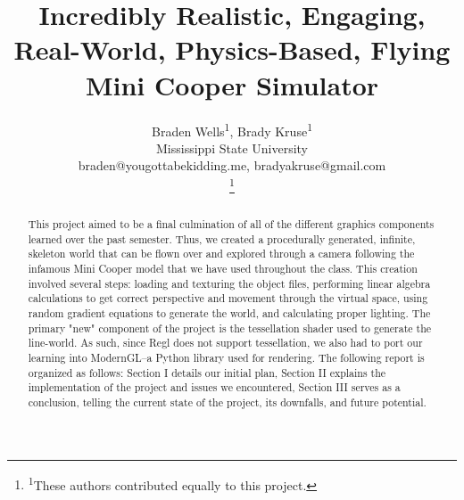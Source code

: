 \documentclass[conference]{IEEEtran}
\begin{document}
\title{Incredibly Realistic, Engaging, Real-World, Physics-Based, Flying Mini Cooper Simulator\\
}

\author{
Braden Wells\textsuperscript{1},
Brady Kruse\textsuperscript{1}
\\
Mississippi State University
\\
\small{braden@yougottabekidding.me, bradyakruse@gmail.com}

\thanks{\textsuperscript{1}These authors contributed equally to this project.}
}

\maketitle

\begin{abstract}
This project aimed to be a final culmination of all of the different graphics components learned over the past semester. Thus, we created a procedurally generated, infinite, skeleton world that can be flown over and explored through a camera following the infamous Mini Cooper model that we have used throughout the class. This creation involved several steps: loading and texturing the object files, performing linear algebra calculations to get correct perspective and movement through the virtual space, using random gradient equations to generate the world, and calculating proper lighting. The primary "new" component of the project is the tessellation shader used to generate the line-world. As such, since Regl does not support tessellation, we also had to port our learning into ModernGL--a Python library used for rendering. The following report is organized as follows: Section I details our initial plan, Section II explains the implementation of the project and issues we encountered, Section III serves as a conclusion, telling the current state of the project, its downfalls, and future potential.
\end{abstract}
\end{document}
